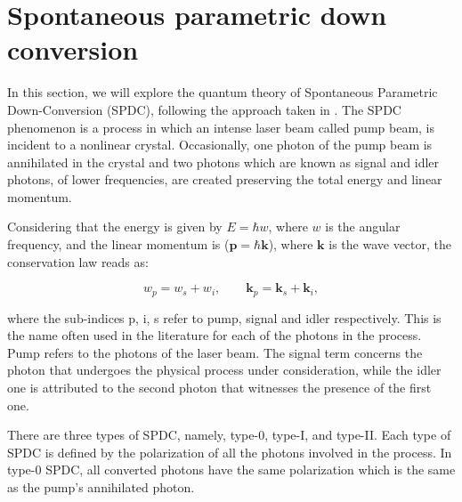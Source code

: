 \documentclass[12pt]{book}
\begin{document}
  
\pagebreak



\chapter{Spontaneous parametric down conversion}



In this section, we will explore the quantum theory of Spontaneous Parametric Down-Conversion (SPDC), following the approach taken in \cite{procopio,multiphoton}. The SPDC phenomenon is a process in which an intense laser beam called pump beam, is incident to a nonlinear crystal. Occasionally, one photon of the pump beam is annihilated in the crystal and two photons which are known as signal and idler photons, of lower frequencies, are created preserving the total energy and linear momentum.

Considering that the energy is given by $E=\hbar w$, where $w$ is the angular frequency, and the linear momentum is ($\mathbf{p}=\hbar \mathbf{k}$), where $\mathbf{k}$ is the wave vector, the conservation law reads as:

\begin{equation}
w_{p}=w_{s}+w_{i}, \qquad \mathbf{k}_{p}=\mathbf{k}_{s}+\mathbf{k}_{i}, \label{conservation}
\end{equation}

where the sub-indices p, i, s refer to pump, signal and idler respectively. This is the name often used in the literature for each of the photons in the process. Pump refers to the photons of the laser beam. The signal term concerns the photon that undergoes the physical process under consideration, while the idler one is attributed to the second photon that witnesses the presence of the first one.

There are three types of SPDC, namely, type-0, type-I, and type-II. Each type of SPDC is defined by the polarization of all the photons involved in the process. In type-0 SPDC, all converted photons have the same polarization which is the same as the pump's annihilated photon.
\end{document}
